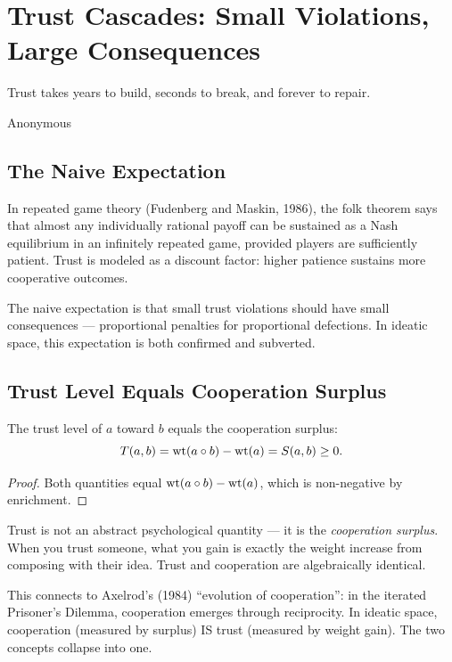 
\chapter{Trust Cascades: Small Violations, Large Consequences}

\epigraph{Trust takes years to build, seconds to break, and forever to repair.}{Anonymous}

\section{The Naive Expectation}

In repeated game theory (Fudenberg and Maskin, 1986), the folk theorem says that almost any individually rational payoff can be sustained as a Nash equilibrium in an infinitely repeated game, provided players are sufficiently patient. Trust is modeled as a discount factor: higher patience sustains more cooperative outcomes.

The naive expectation is that small trust violations should have small consequences --- proportional penalties for proportional defections. In ideatic space, this expectation is both confirmed and subverted.

\section{Trust Level Equals Cooperation Surplus}

\begin{theorem}
\label{thm:trust-surplus}
The trust level of $a$ toward $b$ equals the cooperation surplus:
\[
T(a,b) = \operatorname{wt}(a \circ b) - \operatorname{wt}(a) = S(a,b) \geq 0.
\]
\end{theorem}

\begin{proof}
Both quantities equal $\operatorname{wt}(a \circ b) - \operatorname{wt}(a)$, which is non-negative by enrichment.
\end{proof}

\begin{interpretation}
Trust is not an abstract psychological quantity --- it is the \emph{cooperation surplus}. When you trust someone, what you gain is exactly the weight increase from composing with their idea. Trust and cooperation are algebraically identical.

This connects to Axelrod's (1984) ``evolution of cooperation'': in the iterated Prisoner's Dilemma, cooperation emerges through reciprocity. In ideatic space, cooperation (measured by surplus) IS trust (measured by weight gain). The two concepts collapse into one.
\end{interpretation}

